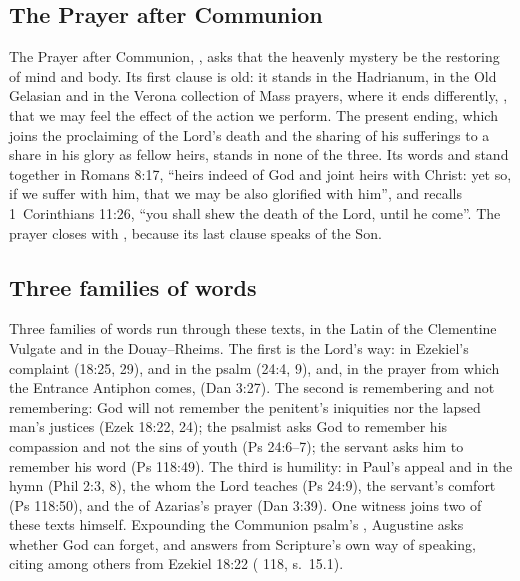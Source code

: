 \subsection{The Prayer after Communion}

The Prayer after Communion, , asks that the heavenly mystery be the restoring of mind and body. Its
first clause is old: it stands in the Hadrianum, in the Old Gelasian and in the
Verona collection of Mass prayers, where it ends differently, , that we may feel the effect of the
action we perform. The present ending, which joins the proclaiming of the
Lord's death and the sharing of his sufferings to a share in his glory as
fellow heirs, stands in none of the three. Its words  and
 stand together in Romans 8:17, ``heirs indeed of God and
joint heirs with Christ: yet so, if we suffer with him, that we may be also
glorified with him'', and  recalls 1~Corinthians
11:26, ``you shall shew the death of the Lord, until he come''. The prayer
closes with , because its last clause speaks of the
Son.

\subsection{Three families of words}

Three families of words run through these texts, in the Latin of the Clementine
Vulgate and in the Douay--Rheims. The first is the Lord's way:  in Ezekiel's complaint (18:25, 29),  and  in the psalm (24:4, 9), and, in the prayer from which the Entrance
Antiphon comes,  (Dan 3:27). The second is remembering
and not remembering: God will not remember the penitent's iniquities nor the
lapsed man's justices (Ezek 18:22, 24); the psalmist asks God to remember his
compassion and not the sins of youth (Ps 24:6--7); the servant asks him to
remember his word (Ps 118:49). The third is humility: 
in Paul's appeal and  in the hymn (Phil 2:3, 8),
the  whom the Lord teaches (Ps 24:9), the servant's comfort
 (Ps 118:50), and the  of
Azarias's prayer (Dan 3:39). One witness joins two of these texts himself.
Expounding the Communion psalm's , Augustine asks whether God can
forget, and answers from Scripture's own way of speaking, citing among others
 from Ezekiel 18:22
( 118, s.~15.1).
